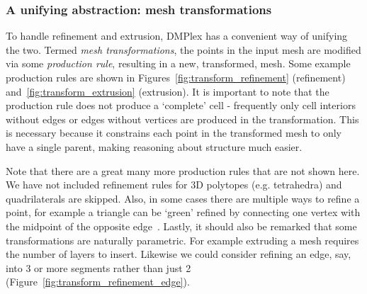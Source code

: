 \subsubsection{A unifying abstraction: mesh transformations}

To handle refinement and extrusion, DMPlex has a convenient way of unifying the two.
Termed \textit{mesh transformations}, the points in the input mesh are modified via some \textit{production rule}, resulting in a new, transformed, mesh.
Some example production rules are shown in Figures~\ref{fig:transform_refinement} (refinement) and~\ref{fig:transform_extrusion} (extrusion).
It is important to note that the production rule does not produce a `complete' cell - frequently only cell interiors without edges or edges without vertices are produced in the transformation.
This is necessary because it constrains each point in the transformed mesh to only have a single parent, making reasoning about structure much easier.

Note that there are a great many more production rules that are not shown here.
We have not included refinement rules for 3D polytopes (e.g. tetrahedra) and quadrilaterals are skipped.
Also, in some cases there are multiple ways to refine a point, for example a triangle can be `green' refined by connecting one vertex with the midpoint of the opposite edge~\cite{bankRefinementAlgorithmDynamic}.
Lastly, it should also be remarked that some transformations are naturally parametric.
For example extruding a mesh requires the number of layers to insert.
Likewise we could consider refining an edge, say, into 3 or more segments rather than just 2 (Figure~\ref{fig:transform_refinement_edge}).

